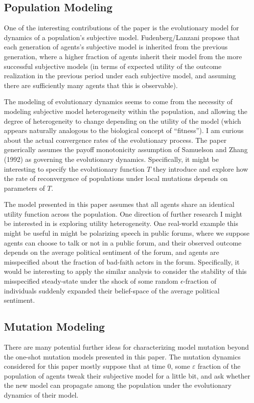 \documentclass[10pt,letter]{article}
\begin{document}
\subsection*{Population Modeling}
One of the interesting contributions of the paper is the evolutionary model for dynamics of a population's subjective model. Fudenberg/Lanzani propose that each generation of agents's subjective model is inherited from the previous generation, where a higher fraction of agents inherit their model from the more successful subjective models (in terms of expected utility of the outcome realization in the previous period under each subjective model, and assuming there are sufficiently many agents that this is observable).

The modeling of evolutionary dynamics seems to come from the necessity of modeling subjective model heterogeneity within the population, and allowing the degree of heterogeneity to change depending on the utility of the model (which appears naturally analogous to the biological concept of ``fitness''). I am curious about the actual convergence rates of the evolutionary process. The paper generically assumes the payoff monotonicity assumption of Samuelson and Zhang (1992) as governing the evolutionary dynamics. Specifically, it might be interesting to specify the evolutionary function $T$ they introduce and explore how the rate of reconvergence of populations under local mutations depends on parameters of $T$.

The model presented in this paper assumes that all agents share an identical utility function across the population. One direction of further research I might be interested in is exploring utility heterogeneity. One real-world example this might be useful in might be polarizing speech in public forums, where we suppose agents can choose to talk or not in a public forum, and their observed outcome depends on the average political sentiment of the forum, and agents are misspecified about the fraction of bad-faith actors in the forum. Specifically, it would be interesting to apply the similar analysis to consider the stability of this misspecified steady-state under the shock of some random $\epsilon$-fraction of individuals suddenly expanded their belief-space of the average political sentiment.


\subsection*{Mutation Modeling}
There are many potential further ideas for characterizing model mutation beyond the one-shot mutation models presented in this paper. The mutation dynamics considered for this paper mostly suppose that at time 0, some $\varepsilon$ fraction of the population of agents tweak their subjective model for a little bit, and ask whether the new model can propagate among the population under the evolutionary dynamics of their model.
\end{document}
